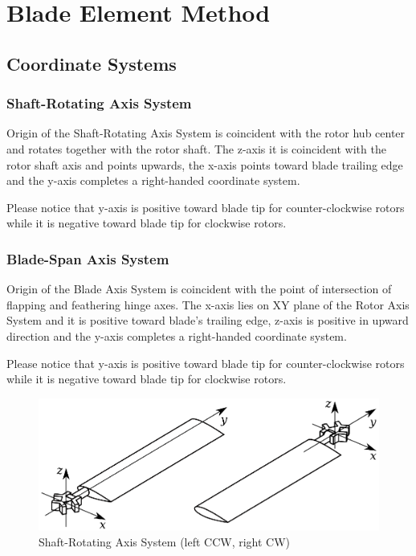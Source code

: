 \chapter{Blade Element Method}

\section{Coordinate Systems}

\subsection{Shaft-Rotating Axis System}

Origin of the Shaft-Rotating Axis System is coincident with the rotor hub center and rotates together with the rotor shaft. The z-axis it is coincident with the rotor shaft axis and points upwards, the x-axis points toward blade trailing edge and the y-axis completes a right-handed coordinate system.

Please notice that y-axis is positive toward blade tip for counter-clockwise rotors while it is negative toward blade tip for clockwise rotors.

\subsection{Blade-Span Axis System}

Origin of the Blade Axis System is coincident with the point of intersection of flapping and feathering hinge axes. The x-axis lies on XY plane of the Rotor Axis System and it is positive toward blade's trailing edge, z-axis is positive in upward direction and the y-axis completes a right-handed coordinate system.

Please notice that y-axis is positive toward blade tip for counter-clockwise rotors while it is negative toward blade tip for clockwise rotors.

\begin{figure}
  \centering
  \includegraphics[width=130mm]{eps/coordinate_system_SRAS.eps}
  \caption{Shaft-Rotating Axis System (left CCW, right CW)}
\end{figure}

